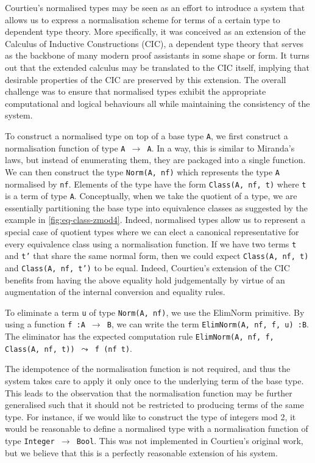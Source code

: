 \documentclass[12pt,twoside,maitrise]{dms}
\theoremstyle{definition}
\numberwithin{equation}{section}
\numberwithin{table}{chapter}
\numberwithin{figure}{chapter}
\newcommand\kw[1] {\textsf{#1}}
\newcommand\id[1] {\texttt{#1}}
\newcommand\fn[1] {\texttt{#1}}
\begin{document}
Courtieu's normalised types\cite{courtieu-normalizedtypes} may be seen as an
effort to introduce a system that allows us to express a normalisation scheme
for terms of a certain type to dependent type theory. More specifically,
it was conceived as an extension of the Calculus of Inductive Constructions
(CIC)\cite{werner-cic}, a dependent type theory that serves as the backbone of
many modern proof assistants in some shape or form. It turns out that the
extended calculus may be translated to the CIC itself, implying that desirable
properties of the CIC are preserved by this extension. The overall challenge was
to ensure that normalised types exhibit the appropriate computational and
logical behaviours all while maintaining the consistency of the system.

To construct a normalised type on top of a base type \id{A}, we first construct
a normalisation function of type \fn{A $\rightarrow$ A}. In a way, this is
similar to Miranda's laws, but instead of enumerating them, they are packaged
into a single function. We can then construct the type \fn{\kw{Norm}(A, nf)}
which represents the type \id{A} normalised by \id{nf}. Elements of the type
have the form \fn{\kw{Class}(A, nf, t)} where \id{t} is a term of type \id{A}.
Conceptually, when we take the quotient of a type, we are essentially
partitioning the base type into equivalence classes as suggested by the example
in \autoref{fig:eq-class-zmod4}. Indeed, normalised types allow us to represent
a special case of quotient types where we can elect a canonical representative
for every equivalence class using a normalisation function. If we have two terms
\id{t} and \id{t'} that share the same normal form, then we could expect
\fn{\kw{Class}(A, nf, t)} and \fn{\kw{Class}(A, nf, t')} to be equal. Indeed,
Courtieu's extension of the CIC benefits from having the above equality hold
judgementally by virtue of an augmentation of the internal conversion and
equality rules.

To eliminate a term \id{u} of type \fn{\kw{Norm}(A, nf)}, we use the
\kw{ElimNorm} primitive. By using a function \fn{f :\@ A $\rightarrow$ B},
we can write the term \fn{\kw{ElimNorm}(A, nf, f, u) :\@ B}. The eliminator
has the expected computation rule \fn{\kw{ElimNorm}(A, nf, f, \kw{Class}(A, nf,
  t)) $\leadsto{}$ f (nf t)}.

The idempotence of the normalisation function is not required, and thus the
system takes care to apply it only once to the underlying term of the base type.
This leads to the observation that the normalisation function may be further
generalised such that it should not be restricted to producing terms of the same
type. For instance, if we would like to construct the type of integers mod 2, it
would be reasonable to define a normalised type with a normalisation function of
type \fn{Integer $\rightarrow$ Bool}. This was not implemented in Courtieu's
original work, but we believe that this is a perfectly reasonable extension of
his system.
\end{document}
